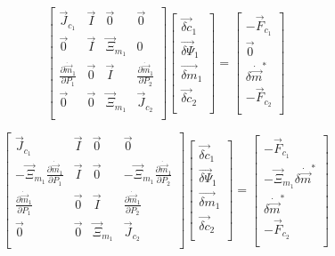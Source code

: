   
 \begin{equation}
\label{eqn:domainDecomp3}
 \begin{bmatrix} 
\vec{J}_{c_1} & \vec{I} & \vec{0} & \vec{0} \\
\vec{0} & \vec{I} & \vec{\Xi}_{m_1} & 0 \\
\frac{\partial \dot{\vec{m}}_{1}}{\partial P_{1} } & \vec{0} & \vec{I} & \frac{\partial \dot{\vec{m}}_{1}}{\partial P_{2} }  \\
\vec{0} & \vec{0} & \vec{\Xi}_{m_1} & \vec{J}_{c_2} \\
 \end{bmatrix} \begin{bmatrix}
 \vec{\delta c}_{1} \\
 \vec{\delta \Psi}_{1} \\
 \vec{\delta m}_{1} \\
 \vec{\delta c}_{2} \\
\end{bmatrix}  = \begin{bmatrix}
 - \vec{F}_{c_1} \\
 \vec{0} \\
 \delta \dot{\vec{m}}^{*} \\
 - \vec{F}_{c_2} \\
\end{bmatrix}
 \end{equation}

 \begin{equation}
\label{eqn:domainDecomp4}
 \begin{bmatrix} 
\vec{J}_{c_1} & \vec{I} & \vec{0} & \vec{0} \\
- \vec{\Xi}_{m_1}\frac{\partial \dot{\vec{m}}_{1}}{\partial P_{1} } & \vec{I} & \vec{0} & -\vec{\Xi}_{m_1}\frac{\partial \dot{\vec{m}}_{1}}{\partial P_{2} } \\
\frac{\partial \dot{\vec{m}}_{1}}{\partial P_{1} } & \vec{0} & \vec{I} & \frac{\partial \dot{\vec{m}}_{1}}{\partial P_{2} }  \\
\vec{0} & \vec{0} & \vec{\Xi}_{m_1} & \vec{J}_{c_2} \\
 \end{bmatrix} \begin{bmatrix}
 \vec{\delta c}_{1} \\
 \vec{\delta \Psi}_{1} \\
 \vec{\delta m}_{1} \\
 \vec{\delta c}_{2} \\
\end{bmatrix}  = \begin{bmatrix}
 - \vec{F}_{c_1} \\
 - \vec{\Xi}_{m_1} \delta \dot{\vec{m}}^{*} \\
 \delta \dot{\vec{m}}^{*} \\
 - \vec{F}_{c_2} \\
\end{bmatrix}
 \end{equation}
 
